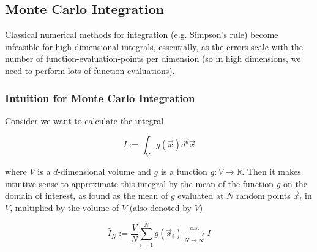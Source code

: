 \subsection{Monte Carlo Integration}
Classical numerical methods for integration (e.g. Simpson's rule) become infeasible for high-dimensional integrals,
essentially, as the errors scale with the number of function-evaluation-points per dimension (so in high dimensions, we need
to perform lots of function evaluations).

\subsubsection{Intuition for Monte Carlo Integration}
Consider we want to calculate the integral

\begin{equation}
    I := \int_{V} g(\vec{x}) d^d \vec{x}
\end{equation}

where $V$ is a $d$-dimensional volume and $g$ is a function $g: V \rightarrow \mathbb{R}$. Then it makes intuitive sense
to approximate this integral by the mean of the function $g$ on the domain of interest, as found as the mean of $g$ evaluated
at $N$ random points $\vec{x}_i$ in $V$, multiplied by the volume of $V$ (also denoted by $V$)

\begin{equation}
\hat{I}_N := \frac{V}{N} \sum_{i=1}^{N} g(\vec{x}_i) \xrightarrow[N \rightarrow \infty]{a.s.} I
\end{equation}



